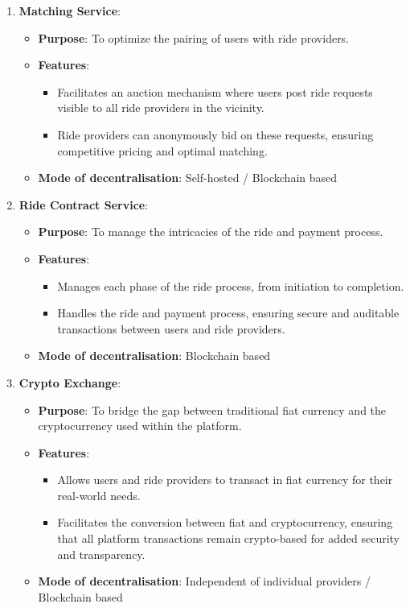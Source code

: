 \begin{enumerate}
    \item \textbf{Matching Service}:
    \begin{itemize}
        \item \textbf{Purpose}: To optimize the pairing of users with ride providers.
        \item \textbf{Features}:
        \begin{itemize}
            \item Facilitates an auction mechanism where users post ride requests visible to all ride providers in the vicinity.
            \item Ride providers can anonymously bid on these requests, ensuring competitive pricing and optimal matching.
        \end{itemize}
        \item \textbf{Mode of decentralisation}: Self-hosted / Blockchain based
    \end{itemize}

    \item \textbf{Ride Contract Service}:
    \begin{itemize}
        \item \textbf{Purpose}: To manage the intricacies of the ride and payment process.
        \item \textbf{Features}:
        \begin{itemize}
            \item Manages each phase of the ride process, from initiation to completion.
            \item Handles the ride and payment process, ensuring secure and auditable transactions between users and ride providers.
        \end{itemize}
        \item \textbf{Mode of decentralisation}: Blockchain based
    \end{itemize}

    \item \textbf{Crypto Exchange}:
    \begin{itemize}
        \item \textbf{Purpose}: To bridge the gap between traditional fiat currency and the cryptocurrency used within the platform.
        \item \textbf{Features}:
        \begin{itemize}
            \item Allows users and ride providers to transact in fiat currency for their real-world needs.
            \item Facilitates the conversion between fiat and cryptocurrency, ensuring that all platform transactions remain crypto-based for added security and transparency.
        \end{itemize}
        \item \textbf{Mode of decentralisation}: Independent of individual providers / Blockchain based
    \end{itemize}
\end{enumerate}

